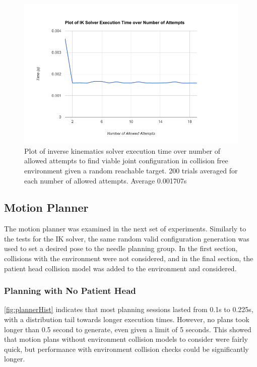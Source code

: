\documentclass[12pt]{report}
\begin{document}
\begin{figure}[thpb]
	\centering
	\includegraphics[width = 5in]{graphs/ik_sover_over_time.png}
    \caption{Plot of inverse kinematics solver execution time over number of allowed attempts to find viable joint configuration in collision free environment given a random reachable target. 200 trials averaged for each number of allowed attempts. Average 0.001707s}
    \label{fig:ikNumAttempts}
\end{figure}

\subsection{Motion Planner}
The motion planner was examined in the next set of experiments. Similarly to the tests for the IK solver, the same random valid configuration generation was used to set a desired pose to the needle planning group. In the first section, collisions with the environment were not considered, and in the final section, the patient head collision model was added to the environment and considered.

\subsubsection{Planning with No Patient Head}
\autoref{fig:plannerHist} indicates that most planning sessions lasted from 0.1s to 
0.225s, with a distribution tail towards longer execution times. However, no plans took longer than 0.5 second to generate, even given a limit of 5 seconds. This showed that motion plans without environment collision models to consider were fairly quick, but performance with environment collision checks could be significantly longer.
\end{document}
